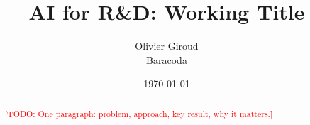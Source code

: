 \documentclass[11pt]{article}
\title{AI for R\&D: Working Title}
\author{
  Olivier Giroud\\
  Baracoda\\
  \texttt{\todo{email}}
}
\date{\today}
\theoremstyle{definition}
\newcommand{\todo}[1]{\textcolor{red}{[TODO: #1]}}
\begin{document}
\maketitle

\begin{abstract}
\todo{One paragraph: problem, approach, key result, why it matters.}
\end{abstract}










\appendix

\end{document}

